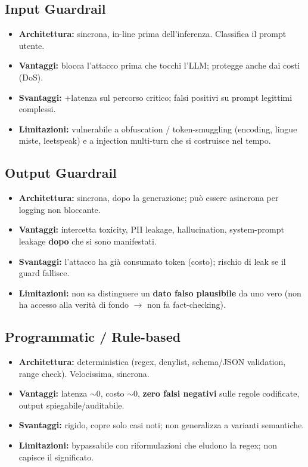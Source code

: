 \documentclass[11pt, a4paper]{article}
\begin{document}
\subsection{Input Guardrail}
\begin{itemize}[leftmargin=*]
    \item \textbf{Architettura:} sincrona, in-line prima dell'inferenza. Classifica il prompt utente.
    \item \textbf{Vantaggi:} blocca l'attacco prima che tocchi l'LLM; protegge anche dai costi (DoS).
    \item \textbf{Svantaggi:} +latenza sul percorso critico; falsi positivi su prompt legittimi complessi.
    \item \textbf{Limitazioni:} vulnerabile a obfuscation / token-smuggling (encoding, lingue miste, leetspeak) e a injection multi-turn che si costruisce nel tempo.
\end{itemize}

\subsection{Output Guardrail}
\begin{itemize}[leftmargin=*]
    \item \textbf{Architettura:} sincrona, dopo la generazione; può essere asincrona per logging non bloccante.
    \item \textbf{Vantaggi:} intercetta toxicity, PII leakage, hallucination, system-prompt leakage \textbf{dopo} che si sono manifestati.
    \item \textbf{Svantaggi:} l'attacco ha già consumato token (costo); rischio di leak se il guard fallisce.
    \item \textbf{Limitazioni:} non sa distinguere un \textbf{dato falso plausibile} da uno vero (non ha accesso alla verità di fondo $\rightarrow$ non fa fact-checking).
\end{itemize}

\subsection{Programmatic / Rule-based}
\begin{itemize}[leftmargin=*]
    \item \textbf{Architettura:} deterministica (regex, denylist, schema/JSON validation, range check). Velocissima, sincrona.
    \item \textbf{Vantaggi:} latenza $\sim 0$, costo $\sim 0$, \textbf{zero falsi negativi} sulle regole codificate, output spiegabile/auditabile.
    \item \textbf{Svantaggi:} rigido, copre solo casi noti; non generalizza a varianti semantiche.
    \item \textbf{Limitazioni:} bypassabile con riformulazioni che eludono la regex; non capisce il significato.
\end{itemize}
\end{document}
